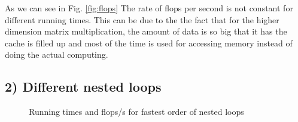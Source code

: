 As we can see in Fig. \ref{fig:flops} The rate of flops per second is not constant for different running times. This can be due to the the fact that for the higher dimension matrix multiplication, the amount of data is so big that it has the cache is filled up and most of the time is used for accessing memory instead of doing the actual computing. 



\subsection*{2) Different nested loops}


\begin{figure}[h!] 
 \center 
 \caption{ Running times and flops/s for fastest order of nested loops \label{fig:fastest}}
 \end{figure}

